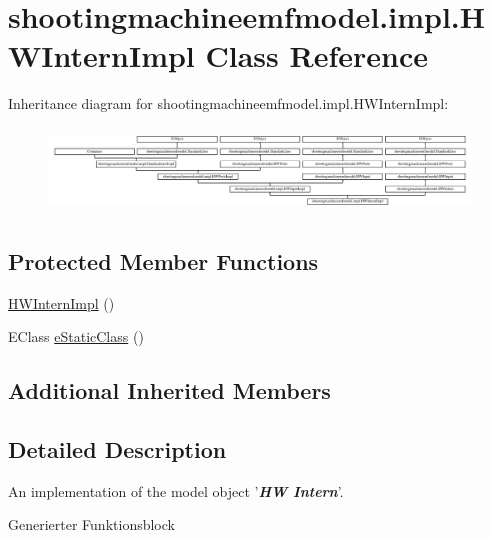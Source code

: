 \hypertarget{classshootingmachineemfmodel_1_1impl_1_1_h_w_intern_impl}{\section{shootingmachineemfmodel.\-impl.\-H\-W\-Intern\-Impl Class Reference}
\label{classshootingmachineemfmodel_1_1impl_1_1_h_w_intern_impl}
}
Inheritance diagram for shootingmachineemfmodel.\-impl.\-H\-W\-Intern\-Impl\-:\begin{figure}[H]
\begin{center}
\leavevmode
\includegraphics[height=2.247492cm]{classshootingmachineemfmodel_1_1impl_1_1_h_w_intern_impl}
\end{center}
\end{figure}
\subsection*{Protected Member Functions}
\begin{DoxyCompactItemize}
\item 
\hyperlink{classshootingmachineemfmodel_1_1impl_1_1_h_w_intern_impl_a79687d56ef5de57c311687a7c35d0604}{H\-W\-Intern\-Impl} ()
\item 
E\-Class \hyperlink{classshootingmachineemfmodel_1_1impl_1_1_h_w_intern_impl_aafb3be9b6da7f43315ed003c15dc0c63}{e\-Static\-Class} ()
\end{DoxyCompactItemize}
\subsection*{Additional Inherited Members}


\subsection{Detailed Description}
An implementation of the model object '{\itshape {\bfseries H\-W Intern}}'.

Generierter Funktionsblock 

